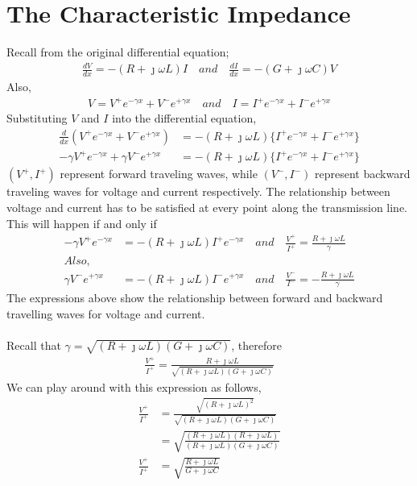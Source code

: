 \section{The Characteristic Impedance}
Recall from the original differential equation;
\begin{align*}
\frac{dV}{dx} = -(R+\jmath\omega L)I \quad and\quad \frac{dI}{dx} = -(G+\jmath\omega C)V
\end{align*}
Also, 
\begin{align*}
V = V^+e^{-\gamma x}+V^-e^{+\gamma x}\quad and \quad I = I^+e^{-\gamma x}+I^-e^{+\gamma x}
\end{align*}
Substituting $V$ and $I$ into the differential equation,
\begin{align*}
\frac{d}{dx}(V^+e^{-\gamma x}+V^-e^{+\gamma x}) &= -(R+\jmath\omega L)\{I^+e^{-\gamma x}+I^-e^{+\gamma x}\}\\
-\gamma V^+e^{-\gamma x}+\gamma V^-e^{+\gamma x} &= -(R+\jmath\omega L)\{I^+e^{-\gamma x}+I^-e^{+\gamma x}\}
\end{align*}
 $(V^+,I^+)$ represent forward traveling waves, while $(V^-,I^-)$ represent backward traveling waves for voltage and current respectively. The relationship between voltage and current has to be satisfied at every point along the transmission line. This will happen if and only if
\begin{align*}
-\gamma V^+e^{-\gamma x} &= -(R+\jmath\omega L)I^+e^{-\gamma x}\quad and\quad \frac{V^+}{I^+} = \frac{R+\jmath\omega L}{\gamma}\\
Also,    \ \ \ \ \                &\\
\gamma V^-e^{+\gamma x} &= -(R+\jmath\omega L)I^-e^{+\gamma x}\quad and\quad \frac{V^-}{I^-} = -\frac{R+\jmath\omega L}{\gamma}
\end{align*}
The expressions above show the relationship between forward and backward travelling waves for voltage and current.\\ \\
Recall that $\gamma = \sqrt{(R + \jmath\omega L)(G + \jmath\omega C)}$, therefore
\begin{align*}
\frac{V^+}{I^+} = \frac{R+\jmath\omega L}{\sqrt{(R + \jmath\omega L)(G + \jmath\omega C)}}
\end{align*}
We can play around with this expression as follows,
\begin{align*}
\frac{V^+}{I^+} &= \frac{\sqrt{(R+\jmath\omega L)^2}}{\sqrt{(R + \jmath\omega L)(G + \jmath\omega C)}}\\
&=\sqrt{\frac{(R+\jmath\omega L)(R+\jmath\omega L)}{(R + \jmath\omega L)(G + \jmath\omega C)}}\\
\frac{V^+}{I^+} &=\sqrt{\frac{R+\jmath\omega L}{G+\jmath\omega C}}
\end{align*}
